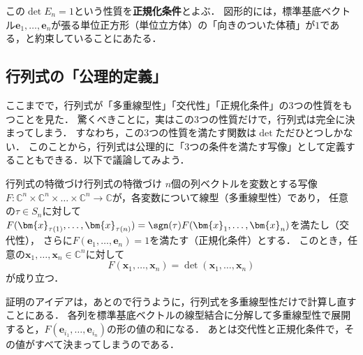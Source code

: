 この$\det E_n = 1$という性質を\textbf{正規化条件}とよぶ．
図形的には，標準基底ベクトル$\bm{e}_1, \dots, \bm{e}_n$が張る単位正方形（単位立方体）の「向きのついた体積」が$1$である，と約束していることにあたる．

\subsection{行列式の「公理的定義」}

ここまでで，行列式が「多重線型性」「交代性」「正規化条件」の$3$つの性質をもつことを見た．
驚くべきことに，実はこの$3$つの性質だけで，行列式は完全に決まってしまう．
すなわち，この$3$つの性質を満たす関数は$\det$ただひとつしかない．
このことから，行列式は公理的に「$3$つの条件を満たす写像」として定義することもできる．以下で議論してみよう．

\begin{prop}{行列式の特徴づけ}{行列式の特徴づけ}
$n$個の列ベクトルを変数とする写像$F \colon \mathbb{C}^n \times \mathbb{C}^n \times \dots \times \mathbb{C}^n \to \mathbb{C}$が，各変数について線型（多重線型性）であり，
任意の$\tau \in S_n$に対して$F(\bm{x}_{\tau(1)}, \dots, \bm{x}_{\tau(n)}) = \sgn(\tau) F(\bm{x}_1, \dots, \bm{x}_n)$を満たし（交代性），
さらに$F(\bm{e}_1, \dots, \bm{e}_n) = 1$を満たす（正規化条件）とする．
このとき，任意の$\bm{x}_1, \dots, \bm{x}_n \in \mathbb{C}^n$に対して
\[
  F(\bm{x}_1, \dots, \bm{x}_n) = \det(\bm{x}_1, \dots, \bm{x}_n)
\]
が成り立つ．
\end{prop}

証明のアイデアは，あとので行うように，行列式を多重線型性だけで計算し直すことにある．
各列を標準基底ベクトルの線型結合に分解して多重線型性で展開すると，$F(\bm{e}_{i_1}, \dots, \bm{e}_{i_n})$の形の値の和になる．
あとは交代性と正規化条件で，その値がすべて決まってしまうのである．

